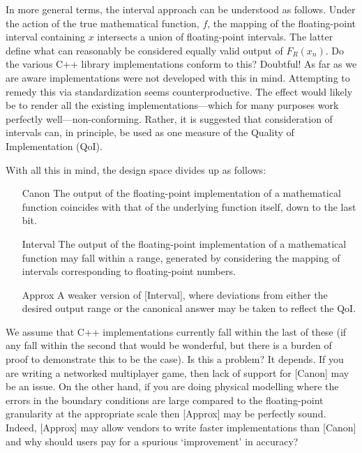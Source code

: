 \documentclass[prd,twocolumn,amsmath,amssymb,nofootinbib,eqsecnum]{revtex4-1}
\begin{document}
In more general terms, the interval approach can be understood as follows. Under the action of the true mathematical function, $f$, the mapping of the floating-point interval containing $x$ intersects a union of floating-point intervals. The latter define what can reasonably be considered equally valid output of $F_R(x_n)$. Do the various C++ library implementations conform to this? Doubtful! As far as we are 
aware implementations were not developed with this in mind.
Attempting to remedy this via standardization seems
counterproductive. The effect would likely be to render all the existing implementations---which for many purposes work perfectly well---non-conforming. Rather, it is suggested that consideration of intervals can,
in principle, be used as one measure of the Quality of Implementation (QoI).

With all this in mind, the design space divides up as follows:
\begin{enumerate}
	\item[Canon] The output of the floating-point implementation of a mathematical function coincides 
	with that of the underlying function itself, down to the last bit.
	
	\item[Interval] The output of the floating-point implementation of a mathematical function may fall 
	within a range, generated by considering the mapping of intervals corresponding to floating-point 
	numbers.
	
	\item[Approx] A weaker version of [Interval], where deviations from either the desired output range 
	or the canonical answer may be taken to reflect the QoI.
\end{enumerate}

We assume that C++ implementations currently fall within the last of these (if any fall within the second that would be wonderful, but there is a burden of proof to demonstrate this to be the case). Is this a problem? It depends. If you are writing a networked multiplayer game, then lack of support for [Canon] may be an issue. On the other hand, if you are doing physical modelling where the errors in the boundary conditions are large compared to the floating-point granularity at the appropriate scale then [Approx] may be perfectly sound. Indeed, [Approx] may allow vendors to write faster implementations than [Canon] and why should users pay for a spurious `improvement' in accuracy?
\end{document}

